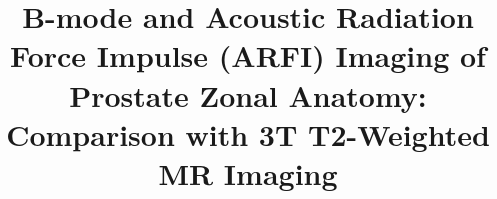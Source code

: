 \title{B-mode and Acoustic Radiation Force Impulse (ARFI) Imaging of Prostate Zonal Anatomy:
    Comparison with 3T T2-Weighted MR Imaging}
